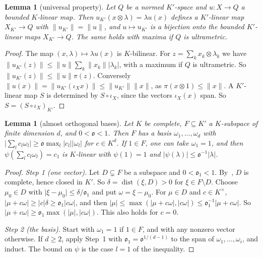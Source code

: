 \documentclass[11pt]{amsart}
\newtheorem{lemma}[theorem]{Lemma}
\theoremstyle{definition}
\theoremstyle{remark}
\numberwithin{equation}{section}
\newcommand{\abs}[1]{\lvert #1\rvert}
\newcommand{\norm}[1]{\lVert #1\rVert}
\theoremstyle{plain}
\theoremstyle{definition}
\theoremstyle{plain}
\begin{document}
\begin{lemma}[universal property]\label{dp:bc:universal}
Let $Q$ be a normed $K'$-space and $u\colon X\to Q$ a bounded $K$-linear map. Then $u_{K'}(x\otimes\lambda)=\lambda u(x)$ defines a $K'$-linear map $X_{K'}\to Q$ with $\norm{u_{K'}}=\norm u$, and $u\mapsto u_{K'}$ is a bijection onto the bounded $K'$-linear maps $X_{K'}\to Q$. The same holds with maxima if $Q$ is ultrametric.
\end{lemma}

\begin{proof}
The map $(x,\lambda)\mapsto\lambda u(x)$ is $K$-bilinear. For $z=\sum_kx_k\otimes\lambda_k$ we have $\norm{u_{K'}(z)}\le\norm u\sum_k\norm{x_k}\abs{\lambda_k}$, with a maximum if $Q$ is ultrametric. So $\norm{u_{K'}(z)}\le\norm u\pi(z)$. Conversely $\norm{u(x)}=\norm{u_{K'}(\iota_Xx)}\le\norm{u_{K'}}\norm x$, as $\pi(x\otimes1)\le\norm x$. A $K'$-linear map $S$ is determined by $S\circ\iota_X$, since the vectors $\iota_X(x)$ span. So $S=(S\circ\iota_X)_{K'}$.
\end{proof}

\begin{lemma}[almost orthogonal bases]\label{dp:bc:orthogonal}
Let $K$ be complete, $F\subseteq K'$ a $K$-subspace of finite dimension $d$, and $0<\mathfrak o<1$. Then $F$ has a basis $\omega_1,\dots,\omega_d$ with $\abs{\sum_lc_l\omega_l}\ge\mathfrak o\max_l\abs{c_l}\abs{\omega_l}$ for $c\in K^d$. If $1\in F$, one can take $\omega_1=1$, and then $\psi(\sum_lc_l\omega_l)=c_1$ is $K$-linear with $\psi(1)=1$ and $\abs{\psi(\lambda)}\le\mathfrak o^{-1}\abs\lambda$.
\end{lemma}

\begin{proof}
\emph{Step 1 (one vector).} Let $D\subsetneq F$ be a subspace and $0<\mathfrak o_1<1$. By~\cite[Lemma~A.3]{I}, $D$ is complete, hence closed in $K'$. So $\delta=\operatorname{dist}(\xi,D)>0$ for $\xi\in F\setminus D$. Choose $\mu_0\in D$ with $\abs{\xi-\mu_0}\le\delta/\mathfrak o_1$ and put $\omega=\xi-\mu_0$. For $\mu\in D$ and $c\in K^\times$, $\abs{\mu+c\omega}\ge\abs c\delta\ge\mathfrak o_1\abs{c\omega}$, and then $\abs\mu\le\max(\abs{\mu+c\omega},\abs{c\omega})\le\mathfrak o_1^{-1}\abs{\mu+c\omega}$. So $\abs{\mu+c\omega}\ge\mathfrak o_1\max(\abs\mu,\abs{c\omega})$. This also holds for $c=0$.

\emph{Step 2 (the basis).} Start with $\omega_1=1$ if $1\in F$, and with any nonzero vector otherwise. If $d\ge2$, apply Step~1 with $\mathfrak o_1=\mathfrak o^{1/(d-1)}$ to the span of $\omega_1,\dots,\omega_i$, and induct. The bound on $\psi$ is the case $l=1$ of the inequality.
\end{proof}
\end{document}
